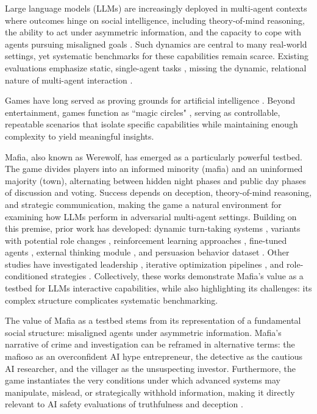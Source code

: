 \documentclass{article}
\begin{document}
Large language models (LLMs) are increasingly deployed in multi-agent contexts where outcomes hinge on social intelligence, including theory-of-mind reasoning, the ability to act under asymmetric information, and the capacity to cope with agents pursuing misaligned goals \citep{gao2024large, guo2024large, wang2024survey}. Such dynamics are central to many real-world settings, yet systematic benchmarks for these capabilities remain scarce. Existing evaluations emphasize static, single-agent tasks \citep{banerjee2024vulnerability, pan2025benchmarks}, missing the dynamic, relational nature of multi-agent interaction \citep{hou2024egosocialarena}.

Games have long served as proving grounds for artificial intelligence \citep{silver2016mastering}. Beyond entertainment, games function as ``magic circles" \citep{huizinga1938homo}, serving as controllable, repeatable scenarios that isolate specific capabilities while maintaining enough complexity to yield meaningful insights.

Mafia, also known as Werewolf, has emerged as a particularly powerful testbed. The game divides players into an informed minority (mafia) and an uninformed majority (town), alternating between hidden night phases and public day phases of discussion and voting. Success depends on deception, theory-of-mind reasoning, and strategic communication, making the game a natural environment for examining how LLMs perform in adversarial multi-agent settings. Building on this premise, prior work has developed: dynamic turn-taking systems \citep{bailis2024werewolfarena}, variants with potential role changes \citep{jin2024onuw}, reinforcement learning approaches \citep{xu2023languageagents}, fine-tuned agents \citep{shibata2023deepwolf}, external thinking module \citep{wu2024thinker}, and persuasion behavior dataset \citep{lai2022werewolfamongus}. Other studies have investigated leadership \citep{du2024helmsman}, iterative optimization pipelines \citep{xu2025lspo}, and role-conditioned strategies \citep{nakamori2025strategy}. Collectively, these works demonstrate Mafia's value as a testbed for LLMs interactive capabilities, while also highlighting its challenges: its complex structure complicates systematic benchmarking.

The value of Mafia as a testbed stems from its representation of a fundamental social structure: misaligned agents under asymmetric information. Mafia’s narrative of crime and investigation can be reframed in alternative terms: the mafioso as an overconfident AI hype entrepreneur, the detective as the cautious AI researcher, and the villager as the unsuspecting investor. Furthermore, 
the game instantiates the very conditions under which advanced systems may manipulate, mislead, or strategically withhold information, making it directly relevant to AI safety evaluations of truthfulness and deception \citep{park2023, evans2021truthful}.
\end{document}
